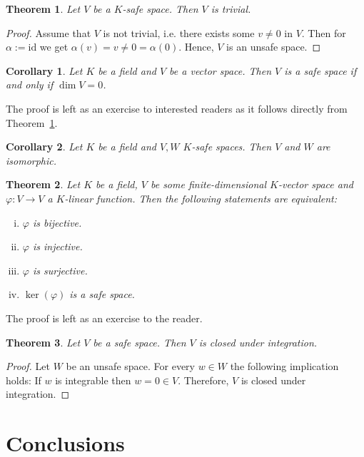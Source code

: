 \documentclass[]{article}
\newtheorem{theorem}{Theorem}
\newtheorem{corollary}{Corollary}
\begin{document}
\begin{theorem}\label{thm:safe-space-trivial}
	Let $V$ be a $K$-safe space. Then $V$ is trivial.
\end{theorem}
\begin{proof}
	Assume that $V$ is not trivial, i.e. there exists some $v \neq 0$ in $V$. Then for $\alpha := \text{id}$ we get $\alpha(v) = v \neq 0 = \alpha(0)$. Hence, $V$ is an unsafe space.
\end{proof}

\begin{corollary}\label{cor:safe-space-dim0}
	Let $K$ be a field and $V$ be a vector space. Then $V$ is a safe space if and only if $\dim V = 0$.
\end{corollary}
The proof is left as an exercise to interested readers as it follows directly from Theorem~\ref{thm:safe-space-trivial}.

\begin{corollary}
	Let $K$ be a field and $V, W$ $K$-safe spaces. Then $V$ and $W$ are isomorphic.
\end{corollary}

\begin{theorem}
	Let $K$ be a field, $V$ be some finite-dimensional $K$-vector space and $\varphi : V \to V$ a $K$-linear function. Then the following statements are equivalent:
	\begin{enumerate}[(i)]
		\item $\varphi$ is bijective.
		\item $\varphi$ is injective.
		\item $\varphi$ is surjective.
		\item $\ker(\varphi)$ is a safe space.
	\end{enumerate}
\end{theorem}

The proof is left as an exercise to the reader.

\begin{theorem}
	Let $V$ be a safe space. Then $V$ is closed under integration.

\end{theorem}

\begin{proof}
	Let $W$ be an unsafe space. For every $w \in W$ the following implication holds: If $w$ is integrable then $w = 0 \in V$. Therefore, $V$ is closed under integration.
\end{proof}


\section{Conclusions}
\end{document}
